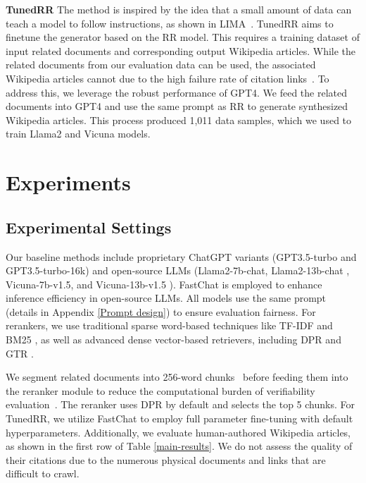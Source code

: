 \documentclass[11pt]{article}
\begin{document}
\noindent \textbf{TunedRR}\quad 
The method is inspired by the idea that a small amount of data can teach a model to follow instructions, as shown in LIMA~\citep{zhou2023lima}. TunedRR aims to finetune the generator based on the RR model. This requires a training dataset of input related documents and corresponding output Wikipedia articles. While the related documents from our evaluation data can be used, the associated Wikipedia articles cannot due to the high failure rate of citation links~\citep{liu2018generating}. To address this, we leverage the robust performance of GPT4. We feed the related documents into GPT4 and use the same prompt as RR to generate synthesized Wikipedia articles. This process produced 1,011 data samples, which we used to train Llama2 and Vicuna models.

\section{Experiments}
\subsection{Experimental Settings}
Our baseline methods include proprietary ChatGPT variants (GPT3.5-turbo and GPT3.5-turbo-16k) and open-source LLMs (Llama2-7b-chat, Llama2-13b-chat \citep{touvron2023llama}, Vicuna-7b-v1.5, and Vicuna-13b-v1.5 \citep{vicuna2023}). FastChat is employed to enhance inference efficiency in open-source LLMs. All models use the same prompt (details in Appendix \ref{Prompt design}) to ensure evaluation fairness. For rerankers, we use traditional sparse word-based techniques like TF-IDF \cite{ramos2003using} and BM25 \cite{robertson2004simple}, as well as advanced dense vector-based retrievers, including DPR \citep{karpukhin-etal-2020-dense} and GTR \citep{ni-etal-2022-large}.

We segment related documents into 256-word chunks~\citep{borgeaud2022improving} before feeding them into the reranker module to reduce the computational burden of verifiability evaluation~\citep{gao2023enabling}. The reranker uses DPR by default and selects the top 5 chunks. For TunedRR, we utilize FastChat to employ full parameter fine-tuning with default hyperparameters. 
Additionally, we evaluate human-authored Wikipedia articles, as shown in the first row of Table \ref{main-results}. We do not assess the quality of their citations due to the numerous physical documents and links that are difficult to crawl.
\end{document}
